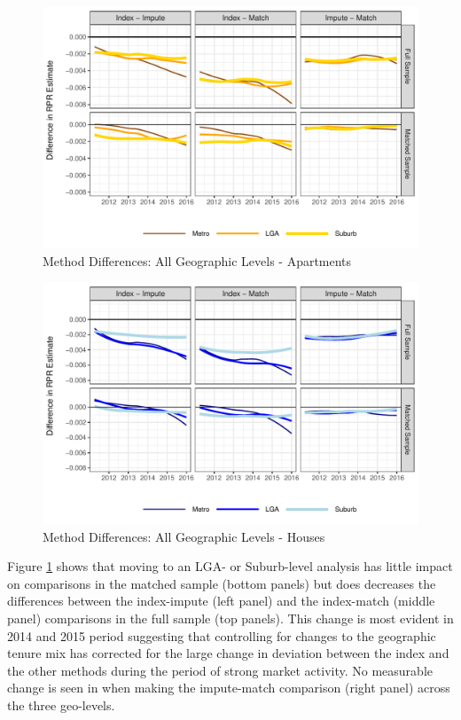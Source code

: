 \documentclass{article}\usepackage[]{graphicx}\usepackage[]{color}
\makeatletter
\def\maxwidth{ %
  \ifdim\Gin@nat@width>\linewidth
    \linewidth
  \else
    \Gin@nat@width
  \fi
}
\makeatother
\begin{document}
\begin{figure}
\centering


\includegraphics[width=\maxwidth]{figure/unit_dif_plot_all-1} 


\caption{Method Differences: All Geographic Levels - Apartments}
\label{allunitdif}
\end{figure}


\begin{figure}
\centering


\includegraphics[width=\maxwidth]{figure/house_dif_plot_all-1} 


\caption{Method Differences: All Geographic Levels - Houses}
\label{allhousedif}
\end{figure}

Figure \ref{allunitdif} shows that moving to an LGA- or Suburb-level analysis has little impact on comparisons in the matched sample (bottom panels) but does decreases the differences between the index-impute (left panel) and the index-match (middle panel) comparisons in the full sample (top panels). This change is most evident in 2014 and 2015 period suggesting that controlling for changes to the geographic tenure mix has corrected for the large change in deviation between the index and the other methods during the period of strong market activity. No measurable change is seen in when making the impute-match comparison (right panel) across the three geo-levels.\par
\end{document}
